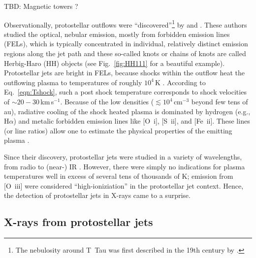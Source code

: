 {\color{red} TBD: Magnetic towers \citep{Huarte_2012}? }

Observationally,  protostellar outflows  were ``discovered''\footnote{The nebulosity around T~Tau was first described in the 19th century  by \citet{Burnham_1890, Burnham_1894}.} by \citet{Herbig_1950,Herbig_1951} and \citet{Haro_1952,Haro_1953}. These authors studied the optical, nebular emission, mostly from forbidden emission lines (FELs), which is typically concentrated in individual, relatively distinct emission regions along the jet path and these so-called knots or chains of knots are called Herbig-Haro (HH) objects (see Fig.~\ref{fig:HH111} for a beautiful example). Protostellar jets are bright in FELs, because shocks within the outflow heat the outflowing plasma to temperatures of roughly $10^4\,$K \citep{}. According to Eq.~\ref{eqn:Tshock}, such a post shock temperature corresponds to shock velocities of $\sim20-30$\,km\,s$^{-1}$.
%
Because of the low densities ($\lesssim10^4\,$cm$^{-3}$ beyond few tens of au), radiative cooling of the shock heated plasma is dominated by hydrogen (e.g., H$\alpha$) and metalic forbidden emission lines like [O~{\sc i}], [S~{\sc ii}], and [Fe~{\sc ii}]. These lines (or line ratios) allow one to estimate the physical properties of the emitting plasma \citep[temperature, density, ionization degree, e.g., ][]{Bacciotti_1999}.

Since their discovery, protostellar jets were studied in a variety of wavelengths, from radio \citep{} to (near-) IR \citep{}. However, there were simply no indications for plasma temperatures well in excess of several tens of thousands of K; emission from [O~{\sc iii}] were considered ``high-ioniziation'' in the protostellar jet context. Hence, the detection of protostellar jets in X-rays came to a surprise.

\subsection{X-rays from protostellar jets}


% 
% 
% 





